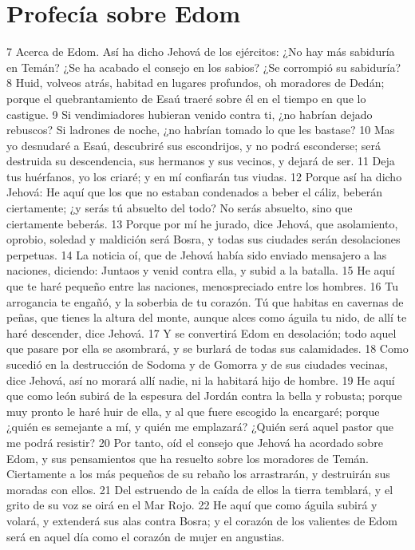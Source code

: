 \section*{Profecía sobre Edom}

7 Acerca de Edom. Así ha dicho Jehová de los ejércitos: ¿No hay más sabiduría en Temán? ¿Se ha acabado el consejo en los sabios? ¿Se corrompió su sabiduría?
8 Huid, volveos atrás, habitad en lugares profundos, oh moradores de Dedán; porque el quebrantamiento de Esaú traeré sobre él en el tiempo en que lo castigue.
9 Si vendimiadores hubieran venido contra ti, ¿no habrían dejado rebuscos? Si ladrones de noche, ¿no habrían tomado lo que les bastase?
10 Mas yo desnudaré a Esaú, descubriré sus escondrijos, y no podrá esconderse; será destruida su descendencia, sus hermanos y sus vecinos, y dejará de ser.
11 Deja tus huérfanos, yo los criaré; y en mí confiarán tus viudas.
12 Porque así ha dicho Jehová: He aquí que los que no estaban condenados a beber el cáliz, beberán ciertamente; ¿y serás tú absuelto del todo? No serás absuelto, sino que ciertamente beberás.
13 Porque por mí he jurado, dice Jehová, que asolamiento, oprobio, soledad y maldición será Bosra, y todas sus ciudades serán desolaciones perpetuas.
14 La noticia oí, que de Jehová había sido enviado mensajero a las naciones, diciendo: Juntaos y venid contra ella, y subid a la batalla.
15 He aquí que te haré pequeño entre las naciones, menospreciado entre los hombres.
16 Tu arrogancia te engañó, y la soberbia de tu corazón. Tú que habitas en cavernas de peñas, que tienes la altura del monte, aunque alces como águila tu nido, de allí te haré descender, dice Jehová.
17 Y se convertirá Edom en desolación; todo aquel que pasare por ella se asombrará, y se burlará de todas sus calamidades.
18 Como sucedió en la destrucción de Sodoma y de Gomorra y de sus ciudades vecinas, dice Jehová, así no morará allí nadie, ni la habitará hijo de hombre.
19 He aquí que como león subirá de la espesura del Jordán contra la bella y robusta; porque muy pronto le haré huir de ella, y al que fuere escogido la encargaré; porque ¿quién es semejante a mí, y quién me emplazará? ¿Quién será aquel pastor que me podrá resistir?
20 Por tanto, oíd el consejo que Jehová ha acordado sobre Edom, y sus pensamientos que ha resuelto sobre los moradores de Temán. Ciertamente a los más pequeños de su rebaño los arrastrarán, y destruirán sus moradas con ellos.
21 Del estruendo de la caída de ellos la tierra temblará, y el grito de su voz se oirá en el Mar Rojo.
22 He aquí que como águila subirá y volará, y extenderá sus alas contra Bosra; y el corazón de los valientes de Edom será en aquel día como el corazón de mujer en angustias. 

